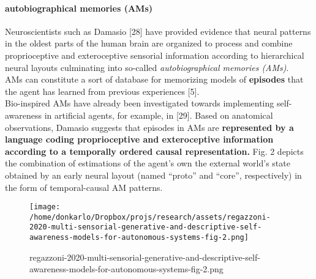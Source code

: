 \documentclass{article}
\begin{document}
			\paragraph{autobiographical memories (AMs)} Neuroscientists such as Damasio \citet{regazzoni-2020-multi-sensorial-generative-and-descriptive-self-awareness-models-for-autonomous-systems}[28] have provided evidence that neural patterns in the oldest parts of the human brain are organized to process and combine proprioceptive and exteroceptive sensorial information according to hierarchical neural layouts culminating into so-called \emph{autobiographical memories (AMs)}. 
			\\
			AMs can constitute a sort of database for memorizing models of \textbf{episodes} that the agent has learned from previous experiences \citet{regazzoni-2020-multi-sensorial-generative-and-descriptive-self-awareness-models-for-autonomous-systems}[5]. 
			\\
			Bio-inspired AMs have already been investigated towards implementing self-awareness in
			artificial agents, for example, in \citet{regazzoni-2020-multi-sensorial-generative-and-descriptive-self-awareness-models-for-autonomous-systems}[29]. Based on anatomical observations, Damasio suggests that episodes in AMs are \textbf{represented by a language coding proprioceptive and exteroceptive information according to a temporally ordered causal representation.} Fig. 2 depicts the combination of estimations
			of the agent’s own the external world’s state obtained by an
			early neural layout (named “proto” and “core”, respectively)
			in the form of temporal-causal AM patterns.
			\begin{figure*}
				\centering
				\texttt{[image: /home/donkarlo/Dropbox/projs/research/assets/regazzoni-2020-multi-sensorial-generative-and-descriptive-self-awareness-models-for-autonomous-systems-fig-2.png]}
				\caption{regazzoni-2020-multi-sensorial-generative-and-descriptive-self-awareness-models-for-autonomous-systems-fig-2.png}
				\label{fig:regazzoni-2020-multi-sensorial-generative-and-descriptive-self-awareness-models-for-autonomous-systems-fig-2.png}
			\end{figure*}
\end{document}
